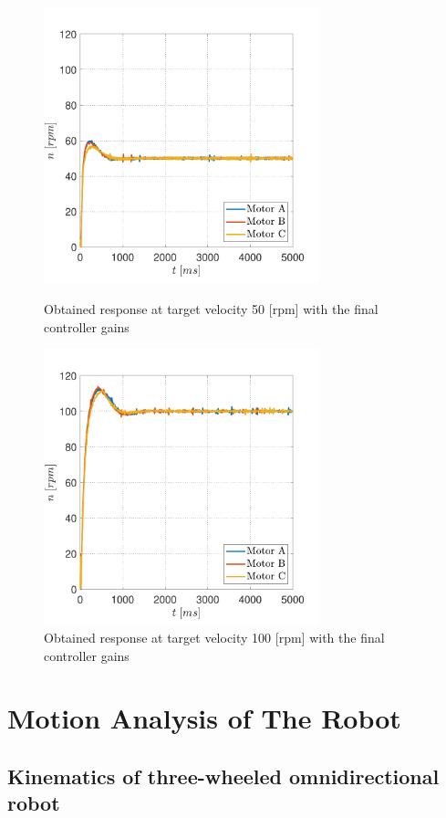 \documentclass[12pt,english,twoside]{article}
\begin{document}
\begin{figure}[htb!]
	\centering
	\centering
	\includegraphics[height=8cm]{figures/controlled_50_p_02_i_002}
	\caption{Obtained response at target velocity 50 [rpm] with the final controller gains}
	\label{obtained_response_50_good}
	\endminipage\hfill
	\centering
	\includegraphics[height=8cm]{figures/controlled_100_p_02_i_002}
	\caption{Obtained response at target velocity 100 [rpm] with the final controller gains}
	\label{obtained_response_100_good}
	\endminipage\hfill
\end{figure}
\newpage

\newpage
\section{Motion Analysis of The Robot}
\subsection{Kinematics of three-wheeled omnidirectional robot}
\end{document}
